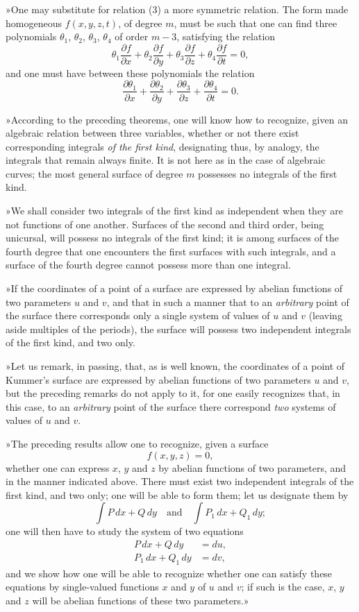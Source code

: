 \documentclass{article}
\begin{document}
»One may substitute for relation (3) a more symmetric relation. The form made homogeneous $f(x, y, z, t)$, of degree $m$, must be such that one can find three polynomials $\theta_{1}$, $\theta_{2}$, $\theta_{3}$, $\theta_{4}$ of order $m - 3$, satisfying the relation
\[
\theta_{1} \frac{\partial f}{\partial x} + \theta_{2} \frac{\partial f}{\partial y} + \theta_{3} \frac{\partial f}{\partial z} + \theta_{4} \frac{\partial f}{\partial t} = 0,
\]
and one must have between these polynomials the relation
\[
\frac{\partial \theta_{1}}{\partial x} + \frac{\partial \theta_{2}}{\partial y} + \frac{\partial \theta_{3}}{\partial z} + \frac{\partial \theta_{4}}{\partial t} = 0.
\]

»According to the preceding theorems, one will know how to recognize, given an algebraic relation between three variables, whether or not there exist corresponding integrals \emph{of the first kind}, designating thus, by analogy, the integrals that remain always finite. It is not here as in the case of algebraic curves; the most general surface of degree $m$ possesses no integrals of the first kind.

»We shall consider two integrals of the first kind as independent when they are not functions of one another. Surfaces of the second and third order, being unicursal, will possess no integrals of the first kind; it is among surfaces of the fourth degree that one encounters the first surfaces with such integrals, and a surface of the fourth degree cannot possess more than one integral.

»If the coordinates of a point of a surface are expressed by abelian
functions of two parameters $u$ and $v$, and that in such a manner that to an \emph{arbitrary} point of the surface there corresponds only a single system of values of $u$ and $v$ (leaving aside multiples of the periods), the surface will possess two independent integrals of the first kind, and two only.

»Let us remark, in passing, that, as is well known, the coordinates of a point of Kummer's surface are expressed by abelian functions of two parameters $u$ and $v$, but the preceding remarks do not apply to it, for one easily recognizes that, in this case, to an \emph{arbitrary} point of the surface there correspond \emph{two} systems of values of $u$ and $v$.

»The preceding results allow one to recognize, given a surface
\[
f(x, y, z) = 0,
\]
whether one can express $x$, $y$ and $z$ by abelian functions of two parameters, and in the manner indicated above. There must exist two independent integrals of the first kind, and two only; one will be able to form them; let us designate them by
\[
\int P\,dx + Q\,dy \quad\text{and}\quad \int P_{1}\,dx + Q_{1}\,dy;
\]
one will then have to study the system of two equations
\[
\begin{aligned}
P\,dx + Q\,dy &= du, \\
P_{1}\,dx + Q_{1}\,dy &= dv,
\end{aligned}
\]
and we show how one will be able to recognize whether one can satisfy these equations by single-valued functions $x$ and $y$ of $u$ and $v$; if such is the case, $x$, $y$ and $z$ will be abelian functions of these two parameters.»
\end{document}
